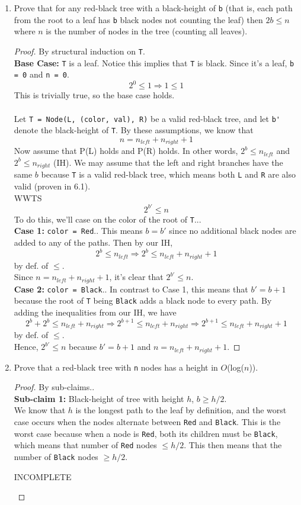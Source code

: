 \documentclass[11pt]{article}
\begin{document}
\begin{enumerate}
\item Prove that for any red-black tree with a black-height of \verb|b| (that is, each path from the root to a leaf has \verb|b| black nodes not counting the leaf) then $2b \leq n$ where $n$ is the number of nodes in the tree (counting all leaves).
\begin{proof}
By structural induction on \verb|T|.\\
\textbf{Base Case:} \verb|T| is a leaf.  Notice this implies that \verb|T| is black.  Since it's a leaf, \verb|b = 0| and \verb|n = 0|.  
\[ 2^0 \leq 1 \Rightarrow 1 \leq 1 \]
This is trivially true, so the base case holds.\\\\
Let \verb|T = Node(L, (color, val), R)| be a valid red-black tree, and let \verb|b'| denote the black-height of \verb|T|.   By these assumptions, we know that
\[ n = n_{left} + n_{right} + 1 \]
Now assume that P(L) holds and P(R) holds.  In other words, $2^b \leq n_{left}$ and $2^b \leq n_{right}$ (IH).  We may assume that the left and right branches have the same $b$ because \verb|T| is a valid red-black tree, which means both \verb|L| and \verb|R| are also valid (proven in 6.1).\\
WWTS 
\[ 2^{b'} \leq n \]
To do this, we'll case on the color of the root of \verb|T|...\\
\textbf{Case 1:} \verb|color = Red|.. This means $b = b'$ since no additional black nodes are added to any of the paths.  Then by our IH, 
\[ 2^b \leq n_{left} \Rightarrow 2^b \leq n_{left} + n_{right} + 1 \]
by def. of $\leq$.\\
Since $n = n_{left} + n_{right} + 1$, it's clear that $2^{b'} \leq n$.\\
\textbf{Case 2:} \verb|color = Black|.. In contrast to Case 1, this means that $b' = b + 1$ because the root of \verb|T| being \verb|Black| adds a black node to every path.  By adding the inequalities from our IH, we have 
\[ 2^b + 2^b \leq n_{left} + n_{right} \Rightarrow 2^{b+1} \leq n_{left} + n_{right} \Rightarrow 2^{b+1} \leq n_{left} + n_{right} + 1 \]
by def. of $\leq$.\\
Hence, $2^{b'} \leq n$ because $b' = b + 1$ and $n = n_{left} + n_{right} + 1$.
\end{proof}
\item Prove that a red-black tree with \verb|n| nodes has a height in $O$(log($n$)).
\begin{proof} By sub-claims..\\
\textbf{Sub-claim 1:} Black-height of tree with height $h$, $b \geq h/2$.\\
We know that $h$ is the longest path to the leaf by definition, and the worst case occurs when the nodes alternate between \verb|Red| and \verb|Black|.  This is  the worst case because when a node is \verb|Red|, both its children must be \verb|Black|, which means that number of \verb|Red| nodes $\leq h/2$.  This then means that the number of \verb|Black| nodes $\geq h/2$.\\
\begin{center} INCOMPLETE\end{center}
\end{proof}
\end{enumerate}
\end{document}
